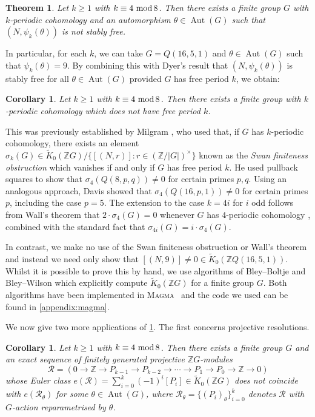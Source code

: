 \documentclass[11pt,leqno,a4paper]{amsart}
\newcommand{\Z}{\mathbb{Z}}
\renewcommand{\mod}{\,\,\text{\normalfont mod}\,}
\DeclareMathOperator{\Aut}{Aut}
\newtheorem{corollary}[thm]{Corollary}
\newtheorem{thmx}{Theorem}
\theoremstyle{definition}
\theoremstyle{remark}
\theoremstyle{custom}
\newcommand{\wt}{\widetilde}
\begin{document}
\begin{thmx} \label{thmx:automorphism}
Let $k \ge 1$ with $k \equiv 4 \mod 8$. Then there exists a finite group $G$ with $k$-periodic cohomology and an automorphism $\theta \in \Aut(G)$ such that $(N,\psi_k(\theta))$ is not stably free.
\end{thmx}

In particular, for each $k$, we can take $G = Q(16,5,1)$ and $\theta \in \Aut(G)$ such that $\psi_k(\theta) = 9$.
By combining this with Dyer's result that $(N,\psi_k(\theta))$ is stably free for all $\theta \in \Aut(G)$ provided $G$ has free period $k$, we obtain:

\begin{corollary}
Let $k \ge 1$ with $k \equiv 4 \mod 8$. Then there exists a finite group with $k$-periodic cohomology which does not have free period $k$.
\end{corollary}

This was previously established by Milgram \cite{Mi85}, who used that, if $G$ has $k$-periodic cohomology, there exists an element $\sigma_k(G) \in \wt K_0(\Z G)/\{ [(N,r)] : r \in (\Z/|G|)^\times\}$ known as the \textit{Swan finiteness obstruction} which vanishes if and only if $G$ has free period $k$. 
He used pullback squares to show that $\sigma_4(Q(8,p,q)) \ne 0$ for certain primes $p,q$. 
Using an analogous approach, Davis \cite{Da81} showed that $\sigma_4(Q(16,p,1)) \ne 0$ for certain primes $p$, including the case $p = 5$. The extension to the case $k =4i$ for $i$ odd follows from Wall's theorem that $2 \cdot \sigma_4(G) = 0$ whenever $G$ has $4$-periodic cohomology \cite{Wa79-paper}, combined with the standard fact that $\sigma_{4i}(G) = i \cdot \sigma_4(G)$.

In contrast, we make no use of the Swan finiteness obstruction or Wall's theorem and instead we need only show that $[(N,9)] \ne 0 \in \wt K_0(\Z Q(16,5,1))$.
Whilst it is possible to prove this by hand, we use algorithms of Bley--Boltje \cite{MR2282916} and Bley--Wilson \cite{MR2564571} which explicitly compute $\wt K_0(\Z G)$ for a finite group $G$.
Both algorithms have been implemented in \textsc{Magma}~\cite{MR1484478} and the code we used can be found in \cref{appendix:magma}.

We now give two more applications of \cref{thmx:automorphism}. The first concerns projective resolutions. 

\begin{corollary} \label{cor:theta-resolutions}
Let $k \ge 1$ with $k \equiv 4 \mod 8$.
Then there exists a finite group $G$ and an exact sequence of finitely generated projective $\Z G$-modules
\[ \mathscr{R} = (0 \to \Z  \to P_{k-1} \to P_{k-2} \to \cdots \to P_1 \to P_0 \to \Z \to 0) \] 
whose Euler class $e(\mathscr{R}) = \sum_{i=0}^k (-1)^i [P_i] \in \wt K_0(\Z G)$ does not coincide with $e(\mathscr{R}_\theta)$ for some $\theta \in \Aut(G)$, where $\mathscr{R}_\theta = \{(P_i)_\theta\}_{i=0}^k$ denotes $\mathscr{R}$ with $G$-action reparametrised by $\theta$. 
\end{corollary}
\end{document}
